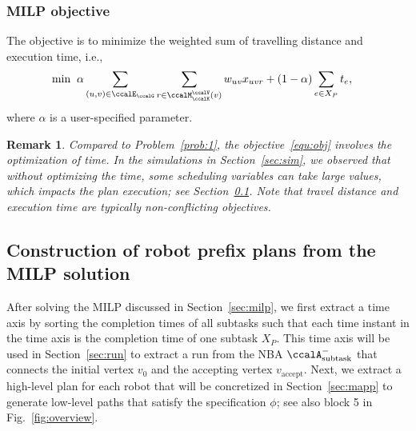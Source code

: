 \documentclass[Afour,sageh,times]{sagej}
\newtheorem{rem}[thm]{Remark}
\newcommand{\auto}[1]{\ccalA_{\textup{#1}}}
\begin{document}
{{{\subsubsection{MILP objective}The objective is to minimize the weighted sum of travelling distance and execution time, i.e.,
\begingroup\makeatletter\def\f@size{10}\check@mathfonts
\def\maketag@@@#1{\hbox{\m@th\normalsize\normalfont#1}}%
\begin{align}\label{equ:obj}
  \min \; \;&  \alpha \sum_{(u,v)\in \ccalE_\ccalG}  \sum_{r \in \ccalM^\ccalV_{\ccalK}(v)} w_{uv} x_{uvr} +  (1 - \alpha) \sum_{e\in X_P} t_e,
\end{align}
 \endgroup
  where $\alpha$ is a user-specified parameter.
  \begin{rem}
   Compared to Problem~\ref{prob:1}, the objective~\eqref{equ:obj} involves the optimization of time. In the simulations in Section~\ref{sec:sim}, we observed that without optimizing the time, some scheduling variables can take large values, which impacts the plan execution; see Section~\ref{sec:path}. Note that travel distance and execution time are typically non-conflicting objectives.

  \end{rem}
\subsection{Construction of robot prefix plans from the MILP solution}\label{sec:path}
After solving the MILP discussed in Section~\ref{sec:milp}, we first extract a time axis by sorting the completion times of all subtasks such that each time instant in the time axis is the completion time of one subtask $X_P$. This time axis  will be used in Section~\ref{sec:run} to extract a run from the NBA $\auto{subtask}^-$ that connects the initial vertex $v_0$ and the accepting vertex $v_\text{accept}$. Next, we extract a high-level plan for each robot  that will be concretized in Section~\ref{sec:mapp} to generate low-level paths that satisfy the specification $\phi$; see also block 5 in Fig.~\ref{fig:overview}.


}}}
\end{document}
